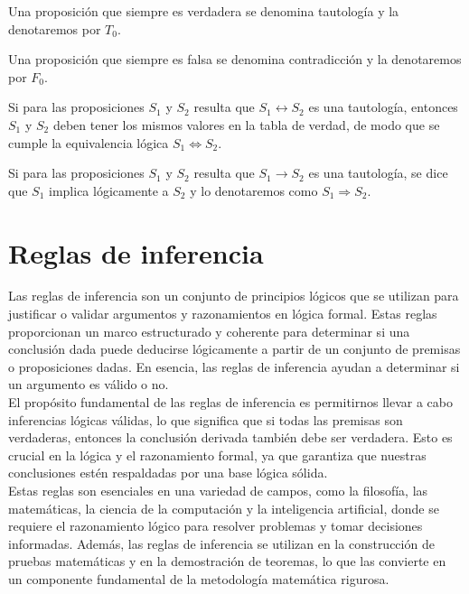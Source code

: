 \newpage

\begin{definicion}{}{}
    Una proposición que siempre es verdadera se denomina tautología y la denotaremos por $T_0$.
\end{definicion}

\begin{definicion}{}{}
    Una proposición que siempre es falsa se denomina contradicción y la denotaremos por $F_0$.
\end{definicion}

\begin{definicion}{}{}
    Si para las proposiciones $S_1$ y $S_2$ resulta que $S_1 \leftrightarrow S_2$ es una tautología, entonces $S_1$ y $S_2$ deben tener los mismos valores en la tabla de verdad, de modo que se cumple la equivalencia lógica $S_1 \Leftrightarrow S_2$.
\end{definicion}

\begin{definicion}{}{}
    Si para las proposiciones $S_1$ y $S_2$ resulta que $S_1 \rightarrow S_2$ es una tautología, se dice que $S_1$ implica lógicamente a $S_2$ y lo denotaremos como $S_1 \Rightarrow S_2$.
\end{definicion}

\section{Reglas de inferencia}

Las reglas de inferencia son un conjunto de principios lógicos que se utilizan para justificar o validar argumentos y razonamientos en lógica formal. Estas reglas proporcionan un marco estructurado y coherente para determinar si una conclusión dada puede deducirse lógicamente a partir de un conjunto de premisas o proposiciones dadas. En esencia, las reglas de inferencia ayudan a determinar si un argumento es válido o no.\\


El propósito fundamental de las reglas de inferencia es permitirnos llevar a cabo inferencias lógicas válidas, lo que significa que si todas las premisas son verdaderas, entonces la conclusión derivada también debe ser verdadera. Esto es crucial en la lógica y el razonamiento formal, ya que garantiza que nuestras conclusiones estén respaldadas por una base lógica sólida.\\


Estas reglas son esenciales en una variedad de campos, como la filosofía, las matemáticas, la ciencia de la computación y la inteligencia artificial, donde se requiere el razonamiento lógico para resolver problemas y tomar decisiones informadas. Además, las reglas de inferencia se utilizan en la construcción de pruebas matemáticas y en la demostración de teoremas, lo que las convierte en un componente fundamental de la metodología matemática rigurosa.\\


